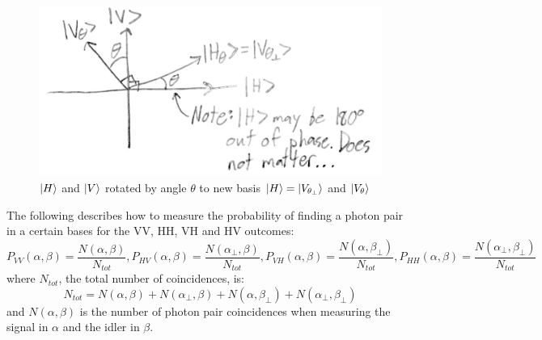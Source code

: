 \documentclass{article}
\begin{document}
    \begin{figure}[H] %
    \centering
    \includegraphics[scale = 0.15]{4.JPG}
    \caption{$\left\vert{H}\right\rangle$ and $\left\vert{V}\right\rangle$ rotated by angle $\theta$ to new basis $\left\vert{H}\right\rangle = \left\vert{V_{\theta_\bot}}\right\rangle$ and $\left\vert{V_\theta}\right\rangle$}
    \label{fig:my_label}
\end{figure}
    The following describes how to measure the probability of finding a photon pair in a certain bases for the VV, HH, VH and HV outcomes: 
    \begin{equation}
        P_{VV}(\alpha,\beta) = \frac{N(\alpha,\beta)}{N_{tot}}, 
        P_{HV}(\alpha,\beta) = \frac{N(\alpha_\bot,\beta)}{N_{tot}}, 
        P_{VH}(\alpha,\beta) = \frac{N(\alpha,\beta_\bot)}{N_{tot}}, 
        P_{HH}(\alpha,\beta) = \frac{N(\alpha_\bot,\beta_\bot)}{N_{tot}} 
    \end{equation}
    where $N_{tot}$, the total number of coincidences, is:
    \begin{equation}
        N_{tot} = N(\alpha,\beta) + N(\alpha_\bot,\beta) + N(\alpha,\beta_\bot) + N(\alpha_\bot,\beta_\bot)
    \end{equation}
    and $N(\alpha,\beta)$ is the number of photon pair coincidences when measuring the signal in $\alpha$ and the idler in $\beta$.
\end{document}
